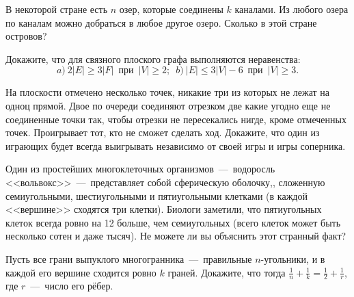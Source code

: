 \begin{exersize}
	В некоторой стране есть $n$ озер, которые соединены $k$ каналами. Из любого озера по каналам можно добраться в любое другое озеро. Сколько в этой стране островов?
\end{exersize}
\begin{exersize}
	Докажите, что для связного плоского графа выполняются неравенства:
	$$a)\!\ 2|E| \geqslant 3|F| \;\ \text{при} \;\ |V| \geqslant 2; \;\ b) \!\ |E| \leqslant 3|V| - 6  \;\ \text{при}  \;\ |V| \geqslant 3.$$
\end{exersize}
\begin{exersize}
	На плоскости отмечено несколько точек, никакие три из которых не лежат на одноц прямой. Двое по очереди соединяют отрезком две какие угодно еще не соединенные точки так, чтобы отрезки не пересекались нигде, кроме отмеченных точек. Проигрывает тот, кто не сможет сделать ход. Докажите, что один из играющих будет всегда выигрывать независимо от своей игры и игры соперника.
\end{exersize}
\begin{exersize}
	Один из простейших многоклеточных организмов~---~водоросль <<вольвокс>>~---~представляет собой сферическую оболочку,, сложенную семиугольными, шестиугольными и пятиугольными клетками (в каждой <<вершине>> сходятся три клетки). Биологи заметили, что пятиугольных клеток всегда ровно на 12 больше, чем семиугольных (всего клеток может быть несколько сотен и даже тысяч). Не можете ли вы объяснить этот странный факт?
\end{exersize}
\begin{exersize}
	Пусть все грани выпуклого многогранника~---~правильные $n$-угольники, и в каждой его вершине сходится ровно $k$ граней. Докажите, что тогда $\frac{1}{n} + \frac{1}{k} = \frac{1}{2} + \frac{1}{r}$, где $r$~---~число его рёбер.
\end{exersize}
